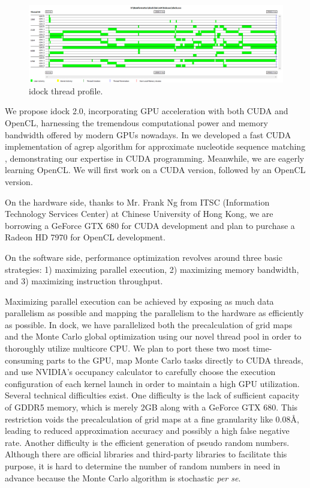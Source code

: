 \begin{figure}
\centering
\includegraphics[width=\textwidth]{idock/ThreadProfile.png}
\caption{idock thread profile.}
\label{idock:ThreadProfile}
\end{figure}

We propose idock 2.0, incorporating GPU acceleration with both CUDA and OpenCL, harnessing the tremendous computational power and memory bandwidth offered by modern GPUs nowadays. In \citeyear{1138} we developed a fast CUDA implementation of agrep algorithm for approximate nucleotide sequence matching \citep{1138}, demonstrating our expertise in CUDA programming. Meanwhile, we are eagerly learning OpenCL. We will first work on a CUDA version, followed by an OpenCL version.

On the hardware side, thanks to Mr. Frank Ng from ITSC (Information Technology Services Center) at Chinese University of Hong Kong, we are borrowing a GeForce GTX 680 for CUDA development and plan to purchase a Radeon HD 7970 for OpenCL development.

On the software side, performance optimization revolves around three basic strategies: 1) maximizing parallel execution, 2) maximizing memory bandwidth, and 3) maximizing instruction throughput.

Maximizing parallel execution can be achieved by exposing as much data parallelism as possible and mapping the parallelism to the hardware as efficiently as possible. In dock, we have parallelized both the precalculation of grid maps and the Monte Carlo global optimization using our novel thread pool in order to thoroughly utilize multicore CPU. We plan to port these two most time-consuming parts to the GPU, map Monte Carlo tasks directly to CUDA threads, and use NVIDIA's occupancy calculator to carefully choose the execution configuration of each kernel launch in order to maintain a high GPU utilization. Several technical difficulties exist. One difficulty is the lack of sufficient capacity of GDDR5 memory, which is merely 2GB along with a GeForce GTX 680. This restriction voids the precalculation of grid maps at a fine granularity like 0.08\AA, leading to reduced approximation accuracy and possibly a high false negative rate. Another difficulty is the efficient generation of pseudo random numbers. Although there are official libraries and third-party libraries to facilitate this purpose, it is hard to determine the number of random numbers in need in advance because the Monte Carlo algorithm is stochastic \textit{per se}.


